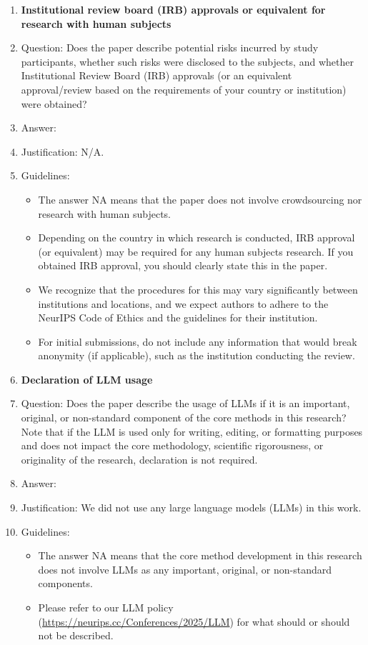 \documentclass{article}
\begin{document}
\begin{enumerate}
\item {\bf Institutional review board (IRB) approvals or equivalent for research with human subjects}
    \item[] Question: Does the paper describe potential risks incurred by study participants, whether such risks were disclosed to the subjects, and whether Institutional Review Board (IRB) approvals (or an equivalent approval/review based on the requirements of your country or institution) were obtained?
    \item[] Answer: \answerNA{} %
    \item[] Justification: N/A.
    \item[] Guidelines:
    \begin{itemize}
        \item The answer NA means that the paper does not involve crowdsourcing nor research with human subjects.
        \item Depending on the country in which research is conducted, IRB approval (or equivalent) may be required for any human subjects research. If you obtained IRB approval, you should clearly state this in the paper. 
        \item We recognize that the procedures for this may vary significantly between institutions and locations, and we expect authors to adhere to the NeurIPS Code of Ethics and the guidelines for their institution. 
        \item For initial submissions, do not include any information that would break anonymity (if applicable), such as the institution conducting the review.
    \end{itemize}

\item {\bf Declaration of LLM usage}
    \item[] Question: Does the paper describe the usage of LLMs if it is an important, original, or non-standard component of the core methods in this research? Note that if the LLM is used only for writing, editing, or formatting purposes and does not impact the core methodology, scientific rigorousness, or originality of the research, declaration is not required.
    \item[] Answer: \answerNo{} %
    \item[] Justification: We did not use any large language models (LLMs) in this work.
    \item[] Guidelines:
    \begin{itemize}
        \item The answer NA means that the core method development in this research does not involve LLMs as any important, original, or non-standard components.
        \item Please refer to our LLM policy (\url{https://neurips.cc/Conferences/2025/LLM}) for what should or should not be described.
    \end{itemize}

\end{enumerate}
\end{document}
